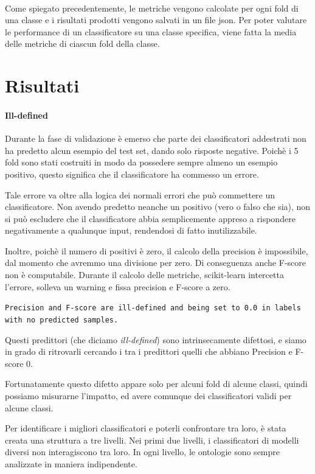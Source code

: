 \documentclass[12pt,a4paper,oneside,hidelinks]{report}
\begin{document}
\paragraph*{}
Come spiegato precedentemente, le metriche vengono calcolate per ogni fold di una classe e i risultati prodotti vengono salvati in un file json. Per poter valutare le performance di un classificatore su una classe specifica, viene fatta la media delle metriche di ciascun fold della classe.

\section{Risultati}

\paragraph{Ill-defined}Durante la fase di validazione è emerso che parte dei classificatori addestrati non ha predetto alcun esempio del test set, dando solo risposte negative. Poichè i 5 fold sono stati costruiti in modo da possedere sempre almeno un esempio positivo, questo significa che il classificatore ha commesso un errore.

Tale errore va oltre alla logica dei normali errori che può commettere un classificatore. Non avendo predetto neanche un positivo (vero o falso che sia), non si può escludere che il classificatore abbia semplicemente appreso a rispondere negativamente a qualunque input, rendendosi di fatto inutilizzabile.

Inoltre, poichè il numero di positivi è zero, il calcolo della precision è impossibile, dal momento che avremmo una divisione per zero. Di conseguenza anche F-score non è computabile. Durante il calcolo delle metriche, scikit-learn intercetta l'errore, solleva un warning e fissa precision e F-score a zero. 

\texttt{Precision and F-score are ill-defined and being set to 0.0 in labels \\
with no predicted samples.}

Questi predittori (che diciamo \emph{ill-defined}) sono intrinsecamente difettosi, e siamo in grado di ritrovarli cercando i tra i predittori quelli che abbiano Precision e F-score 0.

Fortunatamente questo difetto appare solo per alcuni fold di alcune classi, quindi possiamo misurarne l'impatto, ed avere comunque dei classificatori validi per alcune classi.

Per identificare i migliori classificatori e poterli confrontare tra loro, è stata creata una struttura a tre livelli. Nei primi due livelli, i classificatori di modelli diversi non interagiscono tra loro. In ogni livello, le ontologie sono sempre analizzate in maniera indipendente. 
\end{document}
